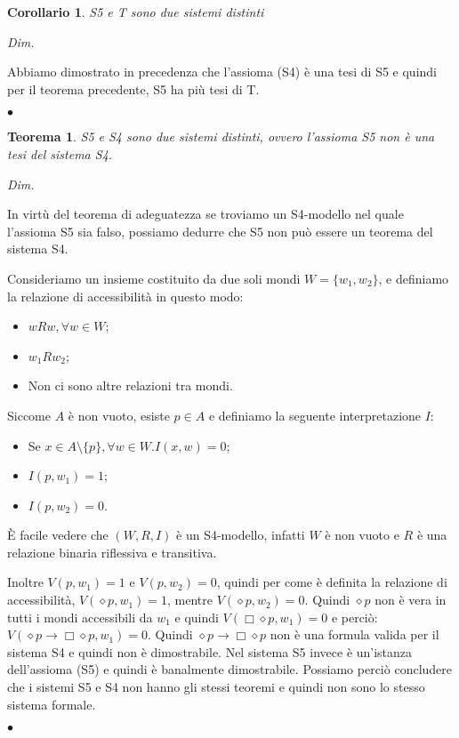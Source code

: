 \documentclass[a4paper, titlepage, 12pt]{report}
\newtheorem{theorem}{Teorema}[chapter]
\newtheorem{corollario}{Corollario}[chapter]
\newenvironment{proof}
    {\textit{Dim.}
    }
    {\begin{flushright}$\bullet$\end{flushright}
    }
\begin{document}
\begin{corollario}
S5 e T sono due sistemi distinti
\end{corollario}

\begin{proof}
Abbiamo dimostrato in precedenza che l'assioma (S4) è una tesi di S5 e quindi
per il teorema precedente, S5 ha più tesi di T.
\end{proof}

\begin{theorem}
S5 e S4 sono due sistemi distinti, ovvero l'assioma S5 non è una tesi del sistema S4.
\end{theorem}

\begin{proof}

In virtù del teorema di adeguatezza se troviamo un S4-modello nel quale l'assioma S5
sia falso, possiamo dedurre che S5 non può essere un teorema del sistema S4.

Consideriamo un insieme costituito da due soli mondi $W = \{w_1, w_2\}$, e definiamo la relazione di accessibilità
in questo modo:
\begin{itemize}
    \item $wRw, \forall w \in W$;
    \item $w_1Rw_2$;
    \item Non ci sono altre relazioni tra mondi.
\end{itemize}

Siccome $A$ è non vuoto, esiste $p \in A$ e definiamo la seguente interpretazione $I:$
\begin{itemize}
    \item Se $x \in A \setminus \{p\}, \forall w \in W. I(x, w) = 0$;
    \item $I(p, w_1) = 1$;
    \item $I(p, w_2) = 0$.
\end{itemize}

È facile vedere che $(W, R, I)$ è un S4-modello, infatti $W$ è non vuoto e
$R$ è una relazione binaria riflessiva e transitiva.

Inoltre $V(p, w_1) = 1$ e $V(p, w_2) = 0$, quindi per come è definita
la relazione di accessibilità, $V(\diamond p, w_1) = 1$, mentre
$V(\diamond p, w_2) = 0$. Quindi $\diamond p$ non è vera in tutti i mondi accessibili da $w_1$
e quindi $V(\Box \diamond p, w_1) = 0$ e perciò: $V(\diamond p \rightarrow \Box\diamond p, w_1) = 0$.
Quindi $\diamond p \rightarrow \Box\diamond p$ non è una formula valida per il sistema S4 e quindi
non è dimostrabile.
Nel sistema S5 invece è un'istanza dell'assioma (S5) e quindi è banalmente dimostrabile.
Possiamo perciò concludere che i sistemi S5 e S4 non hanno gli stessi teoremi e quindi non
sono lo stesso sistema formale.


\end{proof}
\end{document}
